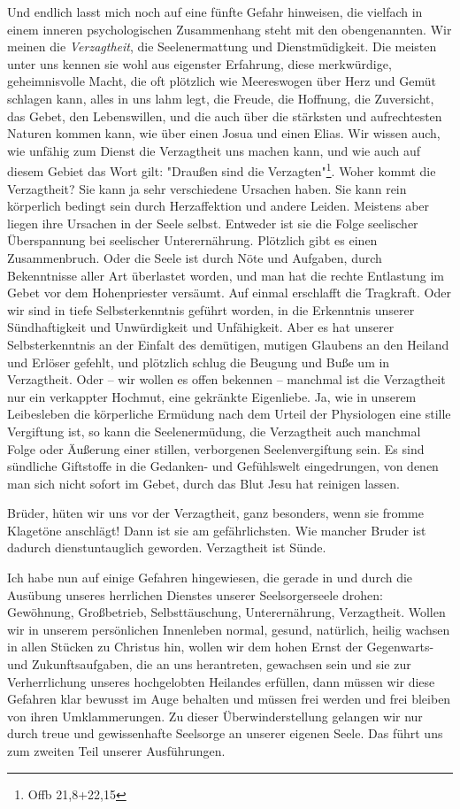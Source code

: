 \documentclass[a5paper,openany]{book}
\begin{document}
\par
Und endlich lasst mich noch auf eine fünfte Gefahr hinweisen, die vielfach in einem inneren psychologischen Zusammenhang steht mit den obengenannten. Wir meinen die \emph{Verzagtheit}, die Seelenermattung und Dienstmüdigkeit. Die meisten unter uns kennen sie wohl aus eigenster Erfahrung, diese merkwürdige, geheimnisvolle Macht, die oft plötzlich wie Meereswogen über Herz und Gemüt schlagen kann, alles in uns lahm legt, die Freude, die Hoffnung, die Zuversicht, das Gebet, den Lebenswillen, und die auch über die stärksten und aufrechtesten Naturen kommen kann, wie über einen Josua und einen Elias. Wir wissen auch, wie unfähig zum Dienst die Verzagtheit uns machen kann, und wie auch auf diesem Gebiet das Wort gilt: "Draußen sind die Verzagten"\footnote{Offb 21,8+22,15}. Woher kommt die Verzagtheit? Sie kann ja sehr verschiedene Ursachen haben. Sie kann rein körperlich bedingt sein durch Herzaffektion und andere Leiden. Meistens aber liegen ihre Ursachen in der Seele selbst. Entweder ist sie die Folge seelischer Überspannung bei seelischer Unterernährung. Plötzlich gibt es einen Zusammenbruch. Oder die Seele ist durch Nöte und Aufgaben, durch Bekenntnisse aller Art überlastet worden, und man hat die rechte Entlastung im Gebet vor dem Hohenpriester versäumt. Auf einmal erschlafft die Tragkraft. Oder wir sind in tiefe Selbsterkenntnis geführt worden, in die Erkenntnis unserer Sündhaftigkeit und Unwürdigkeit und Unfähigkeit. Aber es hat unserer Selbsterkenntnis an der Einfalt des demütigen, mutigen Glaubens an den Heiland und Erlöser gefehlt, und plötzlich schlug die Beugung und Buße um in Verzagtheit. Oder – wir wollen es offen bekennen – manchmal ist die Verzagtheit nur ein verkappter Hochmut, eine gekränkte Eigenliebe. Ja, wie in unserem Leibesleben die körperliche Ermüdung nach dem Urteil der Physiologen eine stille Vergiftung ist, so kann die Seelenermüdung, die Verzagtheit auch manchmal Folge oder Äußerung einer stillen, verborgenen Seelenvergiftung sein. Es sind sündliche Giftstoffe in die Gedanken- und Gefühlswelt eingedrungen, von denen man sich nicht sofort im Gebet, durch das Blut Jesu hat reinigen lassen.
\par
Brüder, hüten wir uns vor der Verzagtheit, ganz besonders, wenn sie fromme Klagetöne anschlägt! Dann ist sie am gefährlichsten. Wie mancher Bruder ist dadurch dienstuntauglich geworden. Verzagtheit ist Sünde.
\par
Ich habe nun auf einige Gefahren hingewiesen, die gerade in und durch die Ausübung unseres herrlichen Dienstes unserer Seelsorgerseele drohen: Gewöhnung, Großbetrieb, Selbsttäuschung, Unterernährung, Verzagtheit. Wollen wir in unserem persönlichen Innenleben normal, gesund, natürlich, heilig wachsen in allen Stücken zu Christus hin, wollen wir dem hohen Ernst der Gegenwarts- und Zukunftsaufgaben, die an uns herantreten, gewachsen sein und sie zur Verherrlichung unseres hochgelobten Heilandes erfüllen, dann müssen wir diese Gefahren klar bewusst im Auge behalten und müssen frei werden und frei bleiben von ihren Umklammerungen. Zu dieser Überwinderstellung gelangen wir nur durch treue und gewissenhafte Seelsorge an unserer eigenen Seele. Das führt uns zum zweiten Teil unserer Ausführungen.
\end{document}
